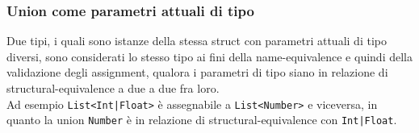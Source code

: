 \subsubsection{Union come parametri attuali di tipo}
Due tipi, i quali sono istanze della stessa struct con parametri attuali di tipo diversi, sono considerati lo stesso 
tipo ai fini della name-equivalence e quindi della validazione degli assignment, qualora i parametri di tipo siano in 
relazione di structural-equivalence a due a due fra loro. \\ 

Ad esempio \texttt{List<Int|Float>} è assegnabile a \texttt{List<Number>} e viceversa, in quanto la union \texttt{Number} è 
in relazione di structural-equivalence con \texttt{Int|Float}.